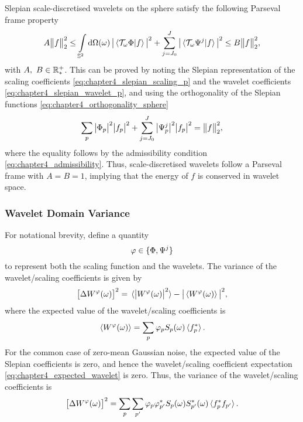 Slepian scale-discretised wavelets on the sphere satisfy the following Parseval frame property
%
\begin{equation}
	A\norm{f}^{2} \leq \integrateSphere{\omega}
	\abs{\braket*{\translation{\omega}\Phi}{f}}^{2}
	+ \waveletSum \abs{\braket*{\translation{\omega}\Psi^{j}}{f}}^{2}
	\leq B\norm{f}^{2},
\end{equation}
%
with \(A,\ B \in \realPosParam{}\).
This can be proved by noting the Slepian representation of the scaling coefficients \cref{eq:chapter4_slepian_scaling_p} and the wavelet coefficients \cref{eq:chapter4_slepian_wavelet_p}, and using the orthogonality of the Slepian functions \cref{eq:chapter4_orthogonality_sphere}
%
\begin{equation}
	\slepianSum \abs{\slepian{\Phi}}^{2} \abs{\slepian{f}}^{2}
	+ \waveletSum \abs{\slepian{\Psi}^{j}}^{2} \abs{\slepian{f}}^{2}
	= \norm{f}^{2},
\end{equation}
%
where the equality follows by the admissibility condition \cref{eq:chapter4_admissibility}.
Thus, scale-discretised wavelets follow a Parseval frame with \(A = B = 1\), implying that the energy of \(f\) is conserved in wavelet space.

\subsubsection{Wavelet Domain Variance}

For notational brevity, define a quantity
%
\begin{equation}\label{eq:chapter4_scaling_and_wavelet}
	\varphi \in \set{\Phi,\Psi^{j}}
\end{equation}
%
to represent both the scaling function and the wavelets.
The variance of the wavelet/scaling coefficients is given by
%
\begin{equation}
	\variance{\pixel{W^{\varphi}}}
	= \expval*{\abs{\pixel{W^{\varphi}}}^{2}}
	-\abs{\expval*{\pixel{W^{\varphi}}}}^{2},
\end{equation}
%
where the expected value of the wavelet/scaling coefficients is
%
\begin{equation}\label{eq:chapter4_expected_wavelet}
	\expval*{\pixel{W^{\varphi}}}
	= \slepianSum \slepian{\varphi} \pixel{\slepian{S}} \expval*{\conj{\slepian{f}}}.
\end{equation}
%
For the common case of zero-mean Gaussian noise, the expected value of the Slepian coefficients is zero, and hence the wavelet/scaling coefficient expectation \cref{eq:chapter4_expected_wavelet} is zero.
Thus, the variance of the wavelet/scaling coefficients is
%
\begin{equation}\label{eq:chapter4_slepian_isotropic_noise}
	\variance{\pixel{W^{\varphi}}}
	= \slepianSum \slepianSum['] \slepian{\varphi} \conj{\slepian[']{\varphi}} \pixel{\slepian{S}} \pixel{\conj{\slepian[']{S}}} \expval*{\conj{\slepian{f}} \slepian[']{f}}.
\end{equation}

